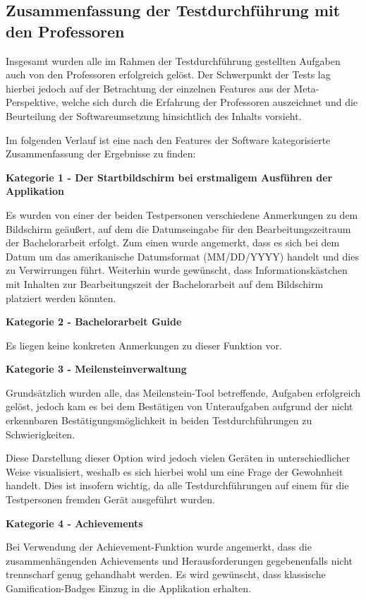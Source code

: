 \documentclass[bibliography=totoc,listof=totoc,BCOR=5mm,DIV=12,oneside]{scrbook}
\begin{document}
{\newpage
\subsection{Zusammenfassung der Testdurchführung mit den Professoren}
\par Insgesamt wurden alle im Rahmen der Testdurchführung gestellten Aufgaben auch von den Professoren erfolgreich gelöst. Der Schwerpunkt der Tests lag hierbei jedoch auf der Betrachtung der einzelnen Features aus der Meta-Perspektive, welche sich durch die Erfahrung der Professoren auszeichnet und die Beurteilung der Softwareumsetzung hinsichtlich des Inhalts vorsieht.
\par \bigskip Im folgenden Verlauf ist eine nach den Features der Software kategorisierte Zusammenfassung der Ergebnisse zu finden:

\par \bigskip \textbf{Kategorie 1 - Der Startbildschirm bei erstmaligem Ausführen der Applikation}
\par Es wurden von einer der beiden Testpersonen verschiedene Anmerkungen zu dem Bildschirm geäußert, auf dem die Datumseingabe für den Bearbeitungszeitraum der Bachelorarbeit erfolgt. Zum einen wurde angemerkt, dass es sich bei dem Datum um das amerikanische Datumsformat (MM/DD/YYYY) handelt und dies zu Verwirrungen führt. Weiterhin wurde gewünscht, dass Informationskästchen mit Inhalten zur Bearbeitungszeit der Bachelorarbeit auf dem Bildschirm platziert werden könnten.

\par \bigskip \textbf{Kategorie 2 - Bachelorarbeit Guide}
\par Es liegen keine konkreten Anmerkungen zu dieser Funktion vor.

\par \bigskip \textbf{Kategorie 3 - Meilensteinverwaltung}
\par Grundsätzlich wurden alle, das Meilenstein-Tool betreffende, Aufgaben erfolgreich gelöst, jedoch kam es bei dem Bestätigen von Unteraufgaben aufgrund der nicht erkennbaren Bestätigungsmöglichkeit in beiden Testdurchführungen zu Schwierigkeiten.
\par Diese Darstellung dieser Option wird jedoch vielen Geräten in unterschiedlicher Weise visualisiert, weshalb es sich hierbei wohl um eine Frage der Gewohnheit handelt. Dies ist insofern wichtig, da alle Testdurchführungen auf einem für die Testpersonen fremden Gerät ausgeführt wurden.

\par \bigskip \textbf{Kategorie 4 - Achievements}
\par Bei Verwendung der Achievement-Funktion wurde angemerkt, dass die zusammenhängenden Achievements und Herausforderungen gegebenenfalls nicht trennscharf genug gehandhabt werden. Es wird gewünscht, dass klassische Gamification-Badges Einzug in die Applikation erhalten.

}
\end{document}
